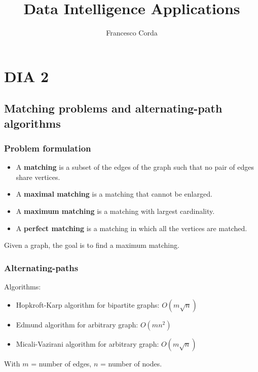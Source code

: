 \documentclass[10pt,a4paper]{article}
\author{Francesco Corda}
\title{Data Intelligence Applications}
\begin{document}
\maketitle
\tableofcontents
\newpage
\setcounter{section}{1}
\section{DIA 2}\label{dia-2}

\subsection{Matching problems and alternating-path algorithms}\label{matching-problems-and-alternating-path-algorithms}

\subsubsection{Problem formulation}\label{problem-formulation}

\begin{itemize}
\item A \textbf{matching} is a subset of the edges of the graph such that no pair of edges share vertices.
\item A \textbf{maximal matching} is a matching that cannot be enlarged.
\item A \textbf{maximum matching} is a matching with largest cardinality.
\item A \textbf{perfect matching} is a matching in which all the vertices are matched.
\end{itemize}

Given a graph, the goal is to find a maximum matching.

\subsubsection{Alternating-paths}\label{alternating-paths}

Algorithms:

\begin{itemize}
\item Hopkroft-Karp algorithm for bipartite graphs: $O(m \sqrt n)$
\item Edmund algorithm for arbitrary graph: $O(m n^2)$
\item Micali-Vazirani algorithm for arbitrary graph: $O(m \sqrt n)$
\end{itemize}
With $m$ = number of edges, $n$ = number of nodes.
\end{document}
